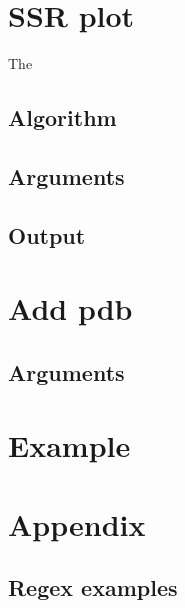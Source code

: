 \documentclass[a4paper,10pt]{article}
\begin{document}
\section{SSR plot} \label{ssr_p}

The 

\subsection{Algorithm}

\subsection{Arguments}

\subsection{Output}

\section{Add pdb} \label{add_p}

\subsection{Arguments}

\section{Example} \label{example}

\section{Appendix} \label{appendix}

\subsection{Regex examples}

% 
% 
% 
% 
% 
% 
% 
% 
\end{document}
